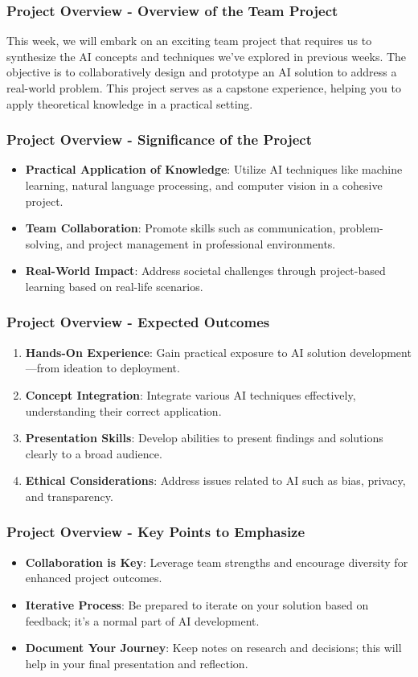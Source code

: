 \documentclass[aspectratio=169]{beamer}
\begin{document}
\begin{frame}[fragile]
    \frametitle{Project Overview - Overview of the Team Project}
    This week, we will embark on an exciting team project that requires us to synthesize the AI concepts and techniques we've explored in previous weeks. 
    The objective is to collaboratively design and prototype an AI solution to address a real-world problem. 
    This project serves as a capstone experience, helping you to apply theoretical knowledge in a practical setting.
\end{frame}

\begin{frame}[fragile]
    \frametitle{Project Overview - Significance of the Project}
    \begin{itemize}
        \item \textbf{Practical Application of Knowledge}: Utilize AI techniques like machine learning, natural language processing, and computer vision in a cohesive project.
        \item \textbf{Team Collaboration}: Promote skills such as communication, problem-solving, and project management in professional environments.
        \item \textbf{Real-World Impact}: Address societal challenges through project-based learning based on real-life scenarios.
    \end{itemize}
\end{frame}

\begin{frame}[fragile]
    \frametitle{Project Overview - Expected Outcomes}
    \begin{enumerate}
        \item \textbf{Hands-On Experience}: Gain practical exposure to AI solution development—from ideation to deployment.
        \item \textbf{Concept Integration}: Integrate various AI techniques effectively, understanding their correct application.
        \item \textbf{Presentation Skills}: Develop abilities to present findings and solutions clearly to a broad audience.
        \item \textbf{Ethical Considerations}: Address issues related to AI such as bias, privacy, and transparency.
    \end{enumerate}
\end{frame}

\begin{frame}[fragile]
    \frametitle{Project Overview - Key Points to Emphasize}
    \begin{itemize}
        \item \textbf{Collaboration is Key}: Leverage team strengths and encourage diversity for enhanced project outcomes.
        \item \textbf{Iterative Process}: Be prepared to iterate on your solution based on feedback; it's a normal part of AI development.
        \item \textbf{Document Your Journey}: Keep notes on research and decisions; this will help in your final presentation and reflection.
    \end{itemize}
\end{frame}
\end{document}

